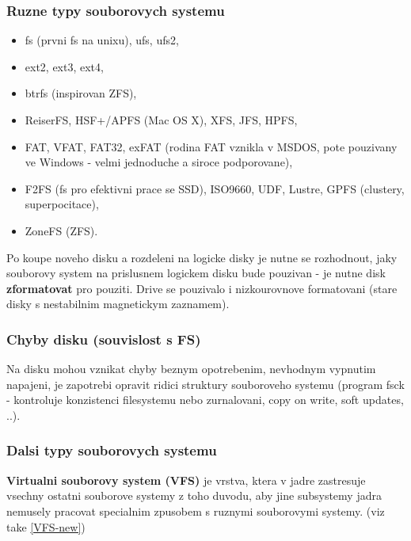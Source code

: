 \documentclass[a4paper, 11pt]{article}
\begin{document}
\subsubsection{Ruzne typy souborovych systemu}
\begin{itemize}
    \item fs (prvni fs na unixu), ufs, ufs2,
    \item ext2, ext3, ext4,
    \item btrfs (inspirovan ZFS),
    \item ReiserFS, HSF+/APFS (Mac OS X), XFS, JFS, HPFS,
    \item FAT, VFAT, FAT32, exFAT (rodina FAT vznikla v MSDOS, pote pouzivany ve Windows - velmi jednoduche a siroce podporovane),
    \item F2FS (fs pro efektivni prace se SSD), ISO9660, UDF, Lustre, GPFS (clustery, superpocitace),
    \item ZoneFS (ZFS). \\
\end{itemize}

\noindent Po koupe noveho disku a rozdeleni na logicke disky je nutne se rozhodnout, jaky souborovy system na prislusnem logickem disku bude pouzivan - je nutne disk \textbf{zformatovat} pro pouziti. Drive se pouzivalo i nizkourovnove formatovani (stare disky s nestabilnim magnetickym zaznamem). \\

\newpage

\subsubsection{Chyby disku (souvislost s FS)}

\noindent Na disku mohou vznikat chyby beznym opotrebenim, nevhodnym vypnutim napajeni, je zapotrebi opravit ridici struktury souboroveho systemu (program fsck - kontroluje konzistenci filesystemu nebo zurnalovani, copy on write, soft updates, ..). \\

\subsubsection{Dalsi typy souborovych systemu} \label{VFS-old} 

\noindent\textbf{Virtualni souborovy system (VFS)} je vrstva, ktera v jadre zastresuje vsechny ostatni souborove systemy z toho duvodu, aby jine subsystemy jadra nemusely pracovat specialnim zpusobem s ruznymi souborovymi systemy. (viz take \ref{VFS-new})  \\
\end{document}
